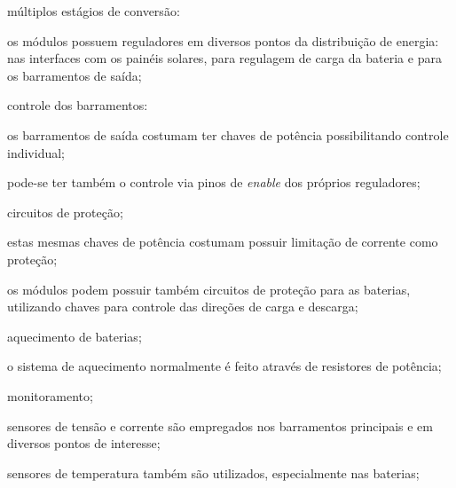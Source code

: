 \begin{alineas}
    \item múltiplos estágios de conversão:
    \begin{alineas}
        \item os módulos possuem reguladores em diversos pontos da distribuição de energia: nas interfaces com os painéis solares, para regulagem de carga da bateria e para os barramentos de saída;
    \end{alineas}

    \item controle dos barramentos:
    \begin{alineas}
        \item os barramentos de saída costumam ter chaves de potência possibilitando controle individual;
        \item pode-se ter também o controle via pinos de \textit{enable} dos próprios reguladores;
    \end{alineas}

    \item circuitos de proteção;
    \begin{alineas}
        \item estas mesmas chaves de potência costumam possuir limitação de corrente como proteção;
        \item os módulos podem possuir também circuitos de proteção para as baterias, utilizando chaves para controle das direções de carga e descarga;
    \end{alineas}

    \item aquecimento de baterias;
    \begin{alineas}
        \item o sistema de aquecimento normalmente é feito através de resistores de potência;
    \end{alineas}
    
    \item monitoramento;
    \begin{alineas}
        \item sensores de tensão e corrente são empregados nos barramentos principais e em diversos pontos de interesse;
        \item sensores de temperatura também são utilizados, especialmente nas baterias;
    \end{alineas}


\end{alineas}
